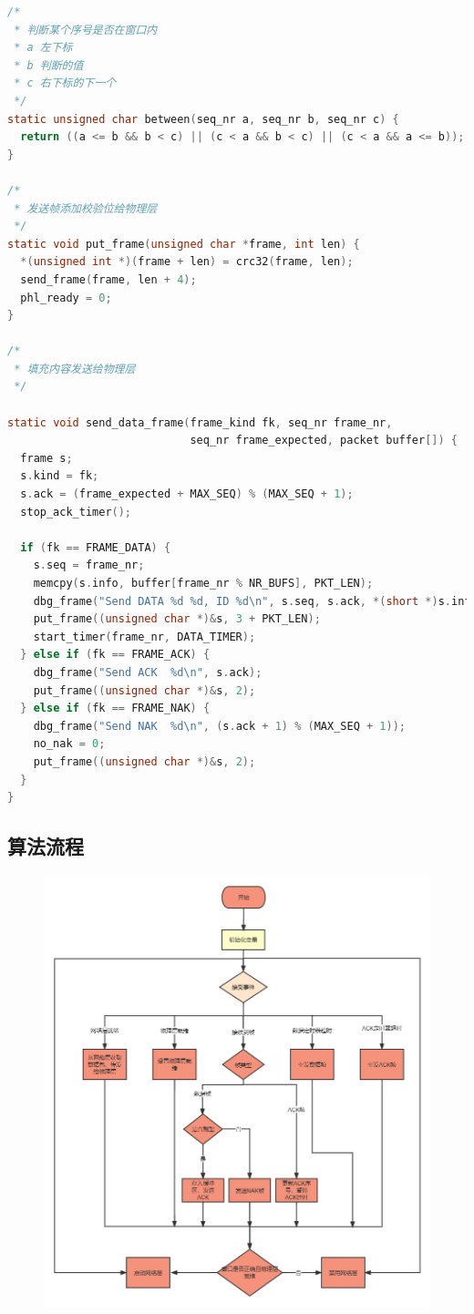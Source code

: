 \begin{lstlisting}[language=C,basicstyle=\tiny\sfmono]
/*
 * 判断某个序号是否在窗口内
 * a 左下标
 * b 判断的值
 * c 右下标的下一个
 */
static unsigned char between(seq_nr a, seq_nr b, seq_nr c) {
  return ((a <= b && b < c) || (c < a && b < c) || (c < a && a <= b));
}

/*
 * 发送帧添加校验位给物理层
 */
static void put_frame(unsigned char *frame, int len) {
  *(unsigned int *)(frame + len) = crc32(frame, len);
  send_frame(frame, len + 4);
  phl_ready = 0;
}

/*
 * 填充内容发送给物理层
 */

static void send_data_frame(frame_kind fk, seq_nr frame_nr,
                            seq_nr frame_expected, packet buffer[]) {
  frame s;
  s.kind = fk;
  s.ack = (frame_expected + MAX_SEQ) % (MAX_SEQ + 1);
  stop_ack_timer();

  if (fk == FRAME_DATA) {
    s.seq = frame_nr;
    memcpy(s.info, buffer[frame_nr % NR_BUFS], PKT_LEN);
    dbg_frame("Send DATA %d %d, ID %d\n", s.seq, s.ack, *(short *)s.info);
    put_frame((unsigned char *)&s, 3 + PKT_LEN);
    start_timer(frame_nr, DATA_TIMER);
  } else if (fk == FRAME_ACK) {
    dbg_frame("Send ACK  %d\n", s.ack);
    put_frame((unsigned char *)&s, 2);
  } else if (fk == FRAME_NAK) {
    dbg_frame("Send NAK  %d\n", (s.ack + 1) % (MAX_SEQ + 1));
    no_nak = 0;
    put_frame((unsigned char *)&s, 2);
  }
}
\end{lstlisting}


\subsection{算法流程}

\begin{figure}[h]
  \centering
  \includegraphics[width=1\textwidth]{figure/process.png}
  \label{fig:process}
\end{figure}